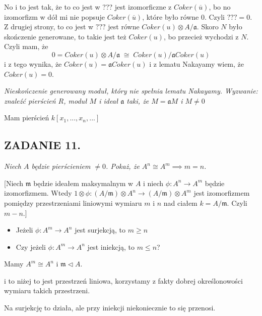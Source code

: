\documentclass{article}
\begin{document}
No i to jest tak, że to co jest w ??? jest izomorficzne z $Coker(\overline{u})$, bo no izomorfizm w dół mi nie popsuje $Coker(\overline{u})$, które było równe $0$. Czyli $???=0$. Z drugiej strony, to co jest w $???$ jest równe $Coker(u)\otimes A/\mathfrak{a}$. Skoro $N$ było skończenie generowane, to takie jest też $Coker(u)$, bo przecież wychodzi z $N$. Czyli mam, że
$$0=Coker(u)\otimes A/\mathfrak{a}\;\cong\; Coker(u)/\mathfrak{a}Coker(u)$$
i z tego wynika, że $Coker(u)=\mathfrak{a}Coker(u)$ i z lematu Nakayamy wiem, że $Coker(u)=0$.


\emph{\color{orange}Nieskończenie generowany moduł, który nie spełnia lematu Nakayamy. Wyzwanie: znaleźć pierścień $R$, moduł $M$ i ideał $\mathfrak{a}$ taki, że $M=\mathfrak{a}M$ i $M\neq 0$}

Mam pierścień $k[x_1,...,x_n,...]$

\subsection*{ZADANIE 11.}
{\slshape\color{blue}Niech $A$ będzie pierścieniem $\neq0$. Pokaż, że $A^n\cong A^m\implies m=n$.

[Niech $\mathfrak{m}$ będzie ideałem maksymalnym w $A$ i niech $\phi:A^n\to A^m$ będzie izomorfizmem. Wtedy $1\otimes\phi:(A/\mathfrak{m})\otimes A^n\to (A/\mathfrak{m})\otimes A^m$ jest izomorfizmem pomiędzy przestrzeniami liniowymi wymiaru $m$ i $n$ nad ciałem $k=A/\mathfrak{m}$. Czyli $m-n$.]

\begin{itemize}
    \item Jeżeli $\phi:A^m\to A^n$ jest surjekcją, to $m\geq n$
    \item Czy jeżeli $\phi:A^m\to A^n$ jest iniekcją, to $m\leq n$?
\end{itemize}}

Mamy $A^m\cong A^n$ i $\mathfrak{m}\triangleleft A$. 

\begin{center}
\end{center}

i to niżej to jest przestrzeń liniowa, korzystamy z fakty dobrej określonowości wymiaru takich przestrzeni.


Na surjekcję to działa, ale przy iniekcji niekoniecznie to się przenosi.
\end{document}

